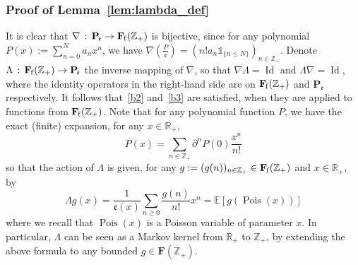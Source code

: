 \documentclass[10pt]{amsart}
\theoremstyle{definition}\newtheorem{defi}[theo]{Definition}\newtheorem{rema}[theo]{Remark}\newtheorem{exam}[theo]{Example}\newtheorem{exem}[theo]{Example}\newtheorem{nota}[theo]{Notation}
\DeclareMathOperator{\Id}{Id}
\DeclareMathOperator{\Pois}{Pois}
\newcommand{\df}{\mathrel{:=}}
\newcommand{\EE}{\mathbb{E}}
\newcommand{\RR}{\mathbb{R}}
\newcommand{\ZZ}{\mathbb{Z}}
\newcommand{\fe}{\mathfrak{e}}
\newcommand{\na}{\nabla}
\newcommand{\pa}{\partial}
\newcommand{\ri}{\rightarrow}
\newcommand{\st}{\,:\,}
\newcommand{\un}{\mathds{1}}
\newcommand{\esP}{\mathbf{P}}
\newcommand{\esF}{\mathbf{F}}
\newcommand{\esPe}{\esP_{\! \fe}}
\newcommand{\esFf}{\esF_{\hskip-.3mm\mathrm{f}}}
\begin{document}
\subsubsection{Proof of Lemma~\ref{lem:lambda_def}}

It is clear that $\na\st \esPe\ri \esFf(\ZZ_+)$ is bijective, since for any polynomial $P(x)\df \sum_{n=0}^N a_nx^n$, we have $\na(\frac{P}{\mathfrak e})=(n! a_n \un_{\{ n\leq N\}})_{n\in \ZZ_+}$. Denote $\Lambda\st \esFf(\ZZ_+)\ri\esPe$ the inverse mapping of $\na$, so that $\na \Lambda=\Id$ and $\Lambda \na=\Id$, where the identity operators in the right-hand side are on $\esFf(\ZZ_+)$ and $\esPe$ respectively. It follows that~\eqref{b2} and~\eqref{b3} are satisfied, when they are applied to functions from $\esFf(\ZZ_+)$. Note that for any polynomial function $P$, we have the exact (finite) expansion, for any $ x\in \RR_+$,
\[
P(x)=\sum_{n\in\ZZ_+} \pa^n P(0)\frac{x^n}{n!}
\]
so that the action of $\Lambda$ is given, for any $ g\df(g(n))_{n\in\ZZ_+}\in\esFf(\ZZ_+)$ and $ x\in\RR_+,$ by
\[
\Lambda g(x)=\frac{1}{\fe(x)}\sum_{n\geq 0} \frac{g(n)}{n!} x^n =\EE[g(\Pois(x))]
\]
where we recall that $\Pois(x)$ is a Poisson variable of parameter $x$. In particular, $\Lambda$ can be seen as a Markov kernel from $\RR_+$ to $\ZZ_+$, by extending the above formula to any bounded $g\in\esF(\ZZ_+)$.
\end{document}
